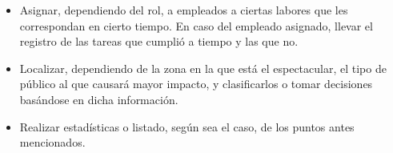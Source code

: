 \begin{itemize}
	\item Asignar, dependiendo del rol, a empleados a ciertas labores que les correspondan en cierto tiempo. En caso del empleado asignado, llevar el registro de las tareas que cumplió a tiempo y las que no.
    
	\item Localizar, dependiendo de la zona en la que está el espectacular, el tipo de público al que causará mayor impacto, y clasificarlos o tomar decisiones basándose en dicha información.
    
	\item Realizar estadísticas o listado, según sea el caso, de los puntos antes mencionados.
\end{itemize}
